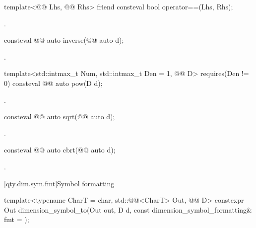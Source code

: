 \begin{itemdecl}
template<@@ Lhs, @@ Rhs>
friend consteval bool operator==(Lhs, Rhs);
\end{itemdecl}

\begin{itemdescr}
\pnum
\returns
{}.
\end{itemdescr}

\begin{itemdecl}
consteval @@ auto inverse(@@ auto d);
\end{itemdecl}

\begin{itemdescr}
\pnum
\returns
{}.
\end{itemdescr}

\begin{itemdecl}
template<std::intmax_t Num, std::intmax_t Den = 1, @@ D>
  requires(Den != 0)
consteval @@ auto pow(D d);
\end{itemdecl}

\begin{itemdescr}
\pnum
\returns
{}.
\end{itemdescr}

\begin{itemdecl}
consteval @@ auto sqrt(@@ auto d);
\end{itemdecl}

\begin{itemdescr}
\pnum
\returns
{}.
\end{itemdescr}

\begin{itemdecl}
consteval @@ auto cbrt(@@ auto d);
\end{itemdecl}

\begin{itemdescr}
\pnum
\returns
{}.
\end{itemdescr}

[qty.dim.sym.fmt]{Symbol formatting}

\begin{itemdecl}
template<typename CharT = char, std::@@<CharT> Out, @@ D>
constexpr Out dimension_symbol_to(Out out, D d, const dimension_symbol_formatting& fmt = {});
\end{itemdecl}

